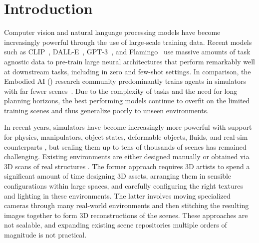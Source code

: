 \section{Introduction}
\label{sec:introduction}

Computer vision and natural language processing models have become increasingly powerful through the use of large-scale training data. Recent models such as CLIP~\cite{Radford2021LearningTV}, DALL-E~\cite{Ramesh2021ZeroShotTG}, GPT-3~\cite{Brown2020LanguageMA}, and Flamingo~\cite{flamingo} use massive amounts of task agnostic data to pre-train large neural architectures that perform remarkably well at downstream tasks, including in zero and few-shot settings. In comparison, the Embodied AI (\eai) research community predominantly trains agents in simulators with far fewer scenes~\cite{Ramakrishnan2021HabitatMatterport3D,kolve2017ai2,Deitke2020RoboTHORAO}. Due to the complexity of tasks and the need for long planning horizons, the best performing \eai models continue to overfit on the limited training scenes and thus generalize poorly to unseen environments.


In recent years, \eai simulators have become increasingly more powerful with support for physics, manipulators, object states, deformable objects, fluids, and real-sim counterparts \cite{kolve2017ai2,savva2019habitat,Shen2020iGibsonAS,Gan2020ThreeDWorldAP,xiang2020sapien}, but scaling them up to tens of thousands of scenes has remained challenging. Existing \eai  environments are either designed manually \cite{kolve2017ai2,Gan2020ThreeDWorldAP} or obtained via 3D scans of real structures \cite{savva2019habitat,Ramakrishnan2021HabitatMatterport3D}. The former approach requires 3D artists to spend a significant amount of time designing 3D assets, arranging them in sensible configurations within large spaces, and carefully configuring the right textures and lighting in these environments. The latter involves moving specialized cameras through many real-world environments and then stitching the resulting images together to form 3D reconstructions of the scenes. These approaches are not scalable, and expanding existing scene repositories multiple orders of magnitude is not practical.

